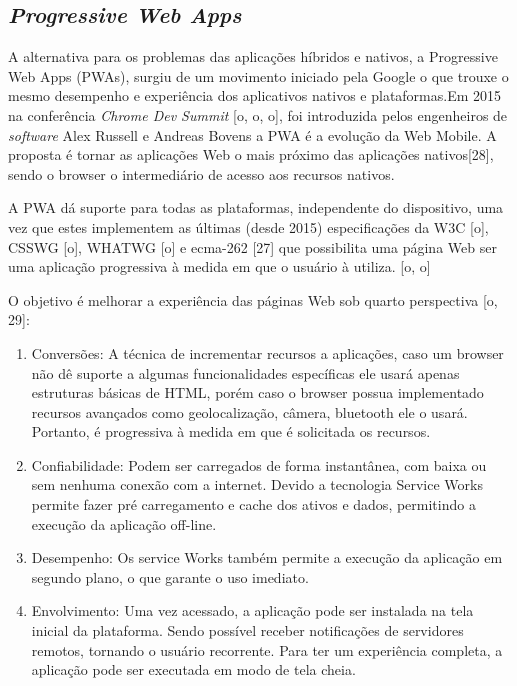 \subsection{\esp \textit{Progressive Web Apps}}

A alternativa para os problemas das aplicações híbridos e nativos, a Progressive Web Apps (PWAs), surgiu de um movimento iniciado pela Google o que trouxe o mesmo desempenho e experiência dos aplicativos nativos e plataformas.Em 2015 na conferência \textit{Chrome Dev Summit} [o, o, o], foi introduzida pelos engenheiros de \textit{software} Alex Russell e Andreas Bovens a PWA é a evolução da Web Mobile. A proposta é tornar as aplicações Web o mais próximo das aplicações nativos[28], sendo o browser o intermediário de acesso aos recursos nativos.

A PWA dá suporte para todas as plataformas, independente do dispositivo, uma vez que estes implementem as últimas (desde 2015) especificações da W3C [o], CSSWG [o], WHATWG [o] e ecma-262 [27] que possibilita uma página Web ser uma aplicação progressiva à medida em que o usuário à utiliza. [o, o]

O objetivo é melhorar a experiência das páginas Web sob quarto perspectiva [o, 29]:

\begin{enumerate} 
	\item Conversões: A técnica de incrementar recursos a aplicações, caso um browser não dê suporte a algumas funcionalidades específicas ele usará apenas estruturas básicas de HTML, porém caso o browser possua implementado recursos avançados como geolocalização, câmera, bluetooth ele o usará. Portanto, é progressiva à medida em que é solicitada os recursos.
	\item Confiabilidade: Podem ser carregados de forma instantânea, com baixa ou sem nenhuma conexão com a internet. Devido a tecnologia Service Works permite fazer pré carregamento e cache dos ativos e dados, permitindo a execução da aplicação off-line.	
	\item Desempenho: Os service Works também permite a execução da aplicação em segundo plano, o que garante o uso imediato.
	\item Envolvimento: Uma vez acessado, a aplicação pode ser instalada na tela inicial da plataforma. Sendo possível receber notificações de servidores remotos, tornando o usuário recorrente.  Para ter um experiência completa, a aplicação pode ser executada em modo de tela cheia.
\end{enumerate}


